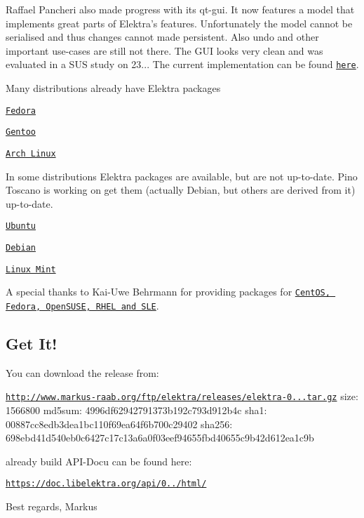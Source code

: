 Raffael Pancheri also made progress with its qt-\/gui. It now features a model that implements great parts of Elektra’s features. Unfortunately the model cannot be serialised and thus changes cannot made persistent. Also undo and other important use-\/cases are still not there. The G\+UI looks very clean and was evaluated in a S\+US study on 23... The current implementation can be found \href{https://github.com/0003088/qt-gui}{\tt here}.

Many distributions already have Elektra packages
\begin{DoxyItemize}
\item \href{https://admin.fedoraproject.org/pkgdb/package/elektra/}{\tt Fedora}
\item \href{http://packages.gentoo.org/package/app-admin/elektra}{\tt Gentoo}
\item \href{https://aur.archlinux.org/packages/elektra/}{\tt Arch Linux}
\end{DoxyItemize}

In some distributions Elektra packages are available, but are not up-\/to-\/date. Pino Toscano is working on get them (actually Debian, but others are derived from it) up-\/to-\/date.
\begin{DoxyItemize}
\item \href{https://launchpad.net/ubuntu/+source/elektra}{\tt Ubuntu}
\item \href{https://packages.debian.org/de/wheezy/libelektra3}{\tt Debian}
\item \href{http://community.linuxmint.com/software/view/elektra}{\tt Linux Mint}
\end{DoxyItemize}

A special thanks to Kai-\/\+Uwe Behrmann for providing packages for \href{http://software.opensuse.org/download.html?project=home%3Abekun&package=elektra}{\tt Cent\+OS, Fedora, Open\+S\+U\+SE, R\+H\+EL and S\+LE}.

\subsection*{Get It!}

You can download the release from\+:

\href{http://www.markus-raab.org/ftp/elektra/releases/elektra-0.8.7.tar.gz}{\tt http\+://www.\+markus-\/raab.\+org/ftp/elektra/releases/elektra-\/0...\+tar.\+gz} size\+: 1566800 md5sum\+: 4996df62942791373b192c793d912b4c sha1\+: 00887cc8edb3dea1bc110f69ea64f6b700c29402 sha256\+: 698ebd41d540eb0c6427c17c13a6a0f03eef94655fbd40655c9b42d612ea1c9b

already build A\+P\+I-\/\+Docu can be found here\+:

\href{https://doc.libelektra.org/api/0.8.7/html/}{\tt https\+://doc.\+libelektra.\+org/api/0../html/}

Best regards, Markus 